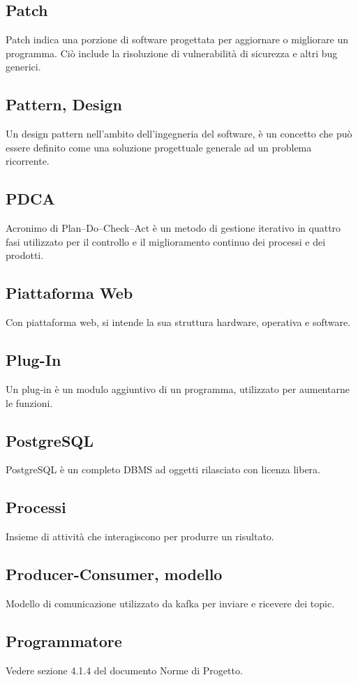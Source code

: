 \subsection{Patch}  Patch indica una porzione di software progettata per aggiornare o migliorare un programma. Ciò include la risoluzione di vulnerabilità di sicurezza e altri bug generici.
\subsection{Pattern, Design}  Un design pattern nell'ambito dell'ingegneria del software, è un concetto che può essere definito come una soluzione progettuale generale ad un problema ricorrente.
\subsection{PDCA}  Acronimo di Plan–Do–Check–Act è un metodo di gestione iterativo in quattro fasi utilizzato per il controllo e il miglioramento continuo dei processi e dei prodotti.
\subsection{Piattaforma Web}  Con piattaforma web, si intende la sua struttura hardware, operativa e software.
\subsection{Plug-In}  Un plug-in è un modulo aggiuntivo di un programma, utilizzato per aumentarne le funzioni.
\subsection{PostgreSQL}  PostgreSQL è un completo DBMS ad oggetti rilasciato con licenza libera.
\subsection{Processi}  Insieme di attività che interagiscono per produrre un risultato.
\subsection{Producer-Consumer, modello}  Modello di comunicazione utilizzato da kafka per inviare e ricevere dei topic.
\subsection{Programmatore}  Vedere sezione 4.1.4 del documento Norme di Progetto.
